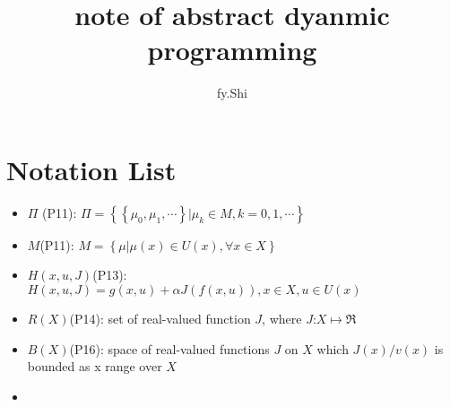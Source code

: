 \documentclass{article}
\title{note of abstract dyanmic programming}
\author{fy.Shi}
\date{}
\begin{document}
\maketitle

\section{Notation List}
\begin{itemize}
	\item $\Pi$ (P11): $\Pi = \left\{ \left\{ \mu_{0}, \mu_{1}, \cdots \right\} | \mu_{k}  \in M, k = 0, 1, \cdots \right\}$
	\item $M$(P11): $M=\left\{ \mu | \mu(x) \in U(x), \forall x \in X \right\}$
	\item $H(x,u,J)$(P13): $H(x,u,J)=g(x,u)+ \alpha J(f(x,u)), x \in X, u \in U(x)$
	\item $R(X)$(P14): set of real-valued function $J$, where $J$:$X \mapsto \Re$
	\item $B(X)$(P16): space of real-valued functions $J$ on $X$ which $J(x)/v(x)$ is bounded as x range over $X$
	\item 
\end{itemize}






\end{document}
